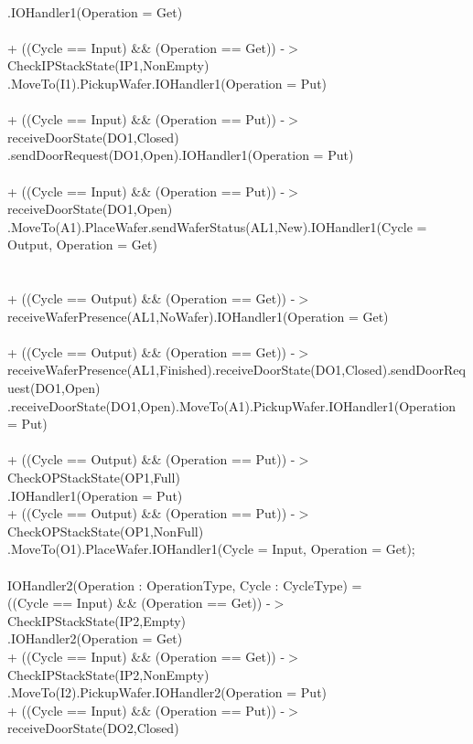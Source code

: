 \documentclass[a4paper,12pt]{article}
\begin{document}
	\\.IOHandler1(Operation = Get)
	\\
	\\+ ((Cycle == Input) \&\& (Operation == Get)) -$>$ CheckIPStackState(IP1,NonEmpty)
	\\.MoveTo(I1).PickupWafer.IOHandler1(Operation = Put)
	\\
	\\+ ((Cycle == Input) \&\& (Operation == Put)) -$>$ receiveDoorState(DO1,Closed)
	\\.sendDoorRequest(DO1,Open).IOHandler1(Operation = Put)
	\\
	\\+ ((Cycle == Input) \&\& (Operation == Put)) -$>$ receiveDoorState(DO1,Open)
	\\.MoveTo(A1).PlaceWafer.sendWaferStatus(AL1,New).IOHandler1(Cycle = Output, Operation = Get)
	\\
	\\
	\\+ ((Cycle == Output) \&\& (Operation == Get)) -$>$ receiveWaferPresence(AL1,NoWafer).IOHandler1(Operation = Get)
	\\
	\\+ ((Cycle == Output) \&\& (Operation == Get)) -$>$ receiveWaferPresence(AL1,Finished).receiveDoorState(DO1,Closed).sendDoorRequest(DO1,Open)
	.receiveDoorState(DO1,Open).MoveTo(A1).PickupWafer.IOHandler1(Operation = Put)
	\\
	\\+ ((Cycle == Output) \&\& (Operation == Put)) -$>$ CheckOPStackState(OP1,Full)
	\\.IOHandler1(Operation = Put)
	\\+ ((Cycle == Output) \&\& (Operation == Put)) -$>$ CheckOPStackState(OP1,NonFull)
	\\.MoveTo(O1).PlaceWafer.IOHandler1(Cycle = Input, Operation = Get);
	\\
	\\IOHandler2(Operation : OperationType, Cycle : CycleType) =
	\\((Cycle == Input) \&\& (Operation == Get)) -$>$ CheckIPStackState(IP2,Empty)
	\\.IOHandler2(Operation = Get)
	\\+ ((Cycle == Input) \&\& (Operation == Get)) -$>$ CheckIPStackState(IP2,NonEmpty)
	\\.MoveTo(I2).PickupWafer.IOHandler2(Operation = Put)
	\\+ ((Cycle == Input) \&\& (Operation == Put)) -$>$ receiveDoorState(DO2,Closed)
\end{document}
